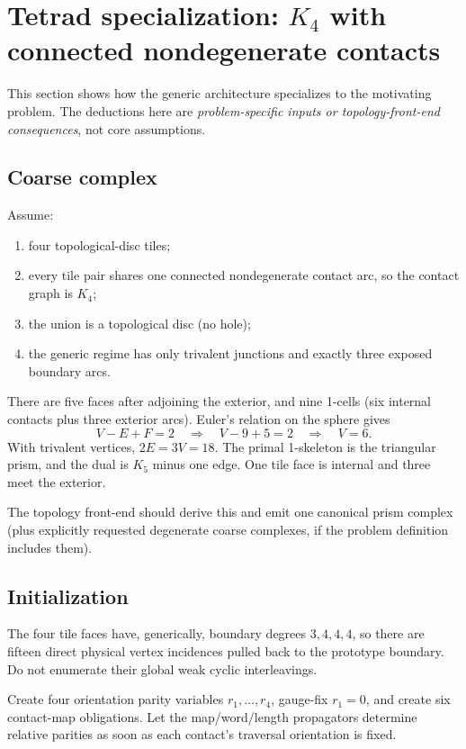 \documentclass[11pt]{article}
\begin{document}
\section{Tetrad specialization: $K_4$ with connected nondegenerate contacts}
\label{sec:tetrad}

This section shows how the generic architecture specializes to the motivating problem.  The deductions here are \emph{problem-specific inputs or topology-front-end consequences}, not core assumptions.

\subsection{Coarse complex}

Assume:
\begin{enumerate}
  \item four topological-disc tiles;
  \item every tile pair shares one connected nondegenerate contact arc, so the contact graph is $K_4$;
  \item the union is a topological disc (no hole);
  \item the generic regime has only trivalent junctions and exactly three exposed boundary arcs.
\end{enumerate}
There are five faces after adjoining the exterior, and nine 1-cells (six internal contacts plus three exterior arcs).  Euler's relation on the sphere gives
\[
  V-E+F=2
  \quad\Longrightarrow\quad
  V-9+5=2
  \quad\Longrightarrow\quad
  V=6.
\]
With trivalent vertices, $2E=3V=18$.  The primal 1-skeleton is the triangular prism, and the dual is $K_5$ minus one edge.  One tile face is internal and three meet the exterior.

The topology front-end should derive this and emit one canonical prism complex (plus explicitly requested degenerate coarse complexes, if the problem definition includes them).

\subsection{Initialization}

The four tile faces have, generically, boundary degrees $3,4,4,4$, so there are fifteen direct physical vertex incidences pulled back to the prototype boundary.  Do not enumerate their global weak cyclic interleavings.

Create four orientation parity variables $r_1,\ldots,r_4$, gauge-fix $r_1=0$, and create six contact-map obligations.  Let the map/word/length propagators determine relative parities as soon as each contact's traversal orientation is fixed.
\end{document}
